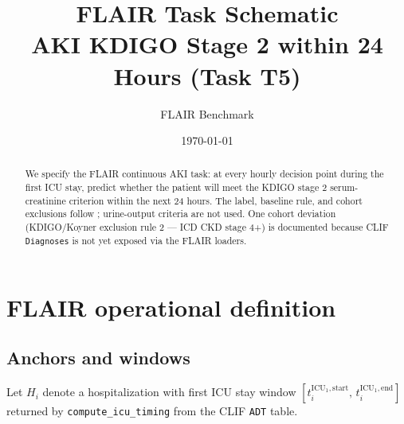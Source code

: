 \documentclass[11pt]{article}
\title{\textbf{FLAIR Task Schematic} \\[0.3em]
       AKI KDIGO Stage 2 within 24 Hours (Task T5)}
\author{FLAIR Benchmark}
\date{\today}
\begin{document}
\maketitle

\begin{abstract}
\noindent We specify the FLAIR continuous AKI task: at every hourly
decision point during the first ICU stay, predict whether the patient
will meet the KDIGO stage 2 serum-creatinine criterion within the next
24 hours. The label, baseline rule, and cohort exclusions follow
\citet{koyner2018aki}; urine-output criteria are not used. One cohort
deviation (KDIGO/Koyner exclusion rule 2 --- ICD CKD stage 4+) is
documented because CLIF \texttt{Diagnoses} is not yet exposed via the
FLAIR loaders.
\end{abstract}

\section{FLAIR operational definition}
\label{sec:def}

\subsection{Anchors and windows}

Let $H_i$ denote a hospitalization with first ICU stay window
$[t^{\text{ICU}_1,\text{start}}_i,\, t^{\text{ICU}_1,\text{end}}_i]$
returned by \verb|compute_icu_timing| from the CLIF \texttt{ADT} table.
\end{document}

